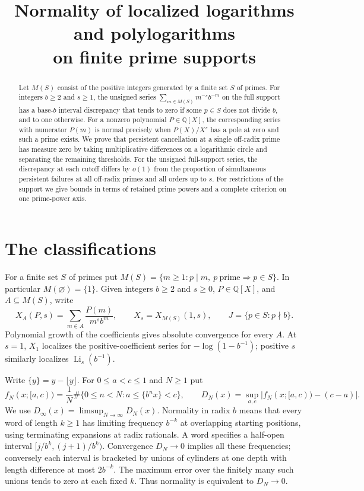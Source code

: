 \documentclass[11pt]{article}
\title{Normality of localized logarithms and polylogarithms\\on finite prime supports}
\author{}
\date{}
\newcommand{\Q}{\mathbb Q}
\newcommand{\dd}{D_{\infty}}
\newcommand{\fract}[1]{\{#1\}}
\begin{document}
\maketitle
\begin{abstract}
Let \(M(S)\) consist of the positive integers generated by a finite set \(S\) of primes. For integers \(b\ge2\) and \(s\ge1\), the unsigned series \(\sum_{m\in M(S)}m^{-s}b^{-m}\) on the full support has a base-\(b\) interval discrepancy that tends to zero if some \(p\in S\) does not divide \(b\), and to one otherwise. For a nonzero polynomial \(P\in\Q[X]\), the corresponding series with numerator \(P(m)\) is normal precisely when \(P(X)/X^s\) has a pole at zero and such a prime exists. We prove that persistent cancellation at a single off-radix prime has measure zero by taking multiplicative differences on a logarithmic circle and separating the remaining thresholds. For the unsigned full-support series, the discrepancy at each cutoff differs by \(o(1)\) from the proportion of simultaneous persistent failures at all off-radix primes and all orders up to \(s\). For restrictions of the support we give bounds in terms of retained prime powers and a complete criterion on one prime-power axis.
\end{abstract}

\section{The classifications}
For a finite set \(S\) of primes put \(M(S)=\{m\ge1:p\mid m,\ p\ \text{prime}\Rightarrow p\in S\}\). In particular \(M(\varnothing)=\{1\}\). Given integers \(b\ge2\) and \(s\ge0\), \(P\in\Q[X]\), and \(A\subseteq M(S)\), write
\begin{equation}\label{eq:series}
 X_A(P,s)=\sum_{m\in A}\frac{P(m)}{m^s b^m},\qquad
 X_s=X_{M(S)}(1,s),\qquad J=\{p\in S:p\nmid b\}.
\end{equation}
Polynomial growth of the coefficients gives absolute convergence for every \(A\). At \(s=1\), \(X_1\) localizes the positive-coefficient series for \(-\log(1-b^{-1})\); positive \(s\) similarly localizes \(\operatorname{Li}_s(b^{-1})\).

Write \(\{y\}=y-\lfloor y\rfloor\). For \(0\le a<c\le1\) and \(N\ge1\) put
\[
 f_N(x;[a,c))=\frac1N\#\{0\le n<N:a\le\fract{b^nx}<c\},\qquad
 D_N(x)=\sup_{a,c}|f_N(x;[a,c))-(c-a)|.
\]
We use \(\dd(x)=\limsup_{N\to\infty}D_N(x)\). Normality in radix \(b\) means that every word of length \(k\ge1\) has limiting frequency \(b^{-k}\) at overlapping starting positions, using terminating expansions at radix rationals. A word specifies a half-open interval \([j/b^k,(j+1)/b^k)\). Convergence \(D_N\to0\) implies all these frequencies; conversely each interval is bracketed by unions of cylinders at one depth with length difference at most \(2b^{-k}\). The maximum error over the finitely many such unions tends to zero at each fixed \(k\). Thus normality is equivalent to \(D_N\to0\).
\end{document}
